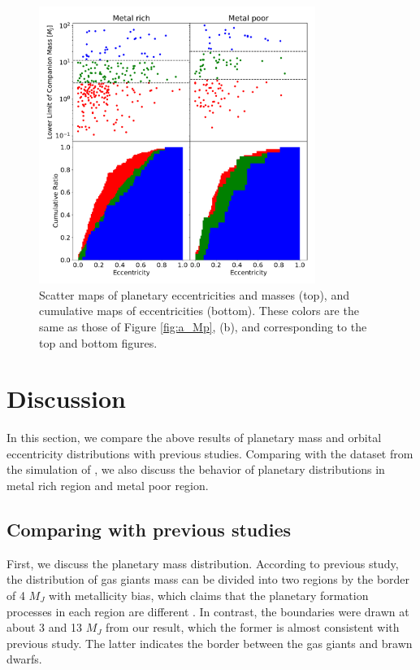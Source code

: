 \documentclass[twocolumn, dvipdfmx]{aastex62}
\begin{document}
\begin{CJK*}{UTF8}{min}
\begin{figure}[H]
\begin{center}
\includegraphics[width=9cm]{../../../Figure/e_Mp_merge.pdf}
\caption{Scatter maps of planetary eccentricities and masses (top), and cumulative maps of eccentricities (bottom). These colors are the same as those of Figure \ref{fig:a_Mp}, (b), and corresponding to the top and bottom figures. \label{fig:e_Mp}}
\end{center}
\end{figure}


\section{Discussion}

In this section, we compare the above results of planetary mass and orbital eccentricity distributions with previous studies. Comparing with the dataset from the simulation of \cite{2012A&A...541A..97M}, we also discuss the behavior of planetary distributions in metal rich region and metal poor region.


\subsection{Comparing with previous studies}

First, we discuss the planetary mass distribution. According to previous study, the distribution of gas giants mass can be divided into two regions by the border of 4 $M_J$ with metallicity bias, which claims that the planetary formation processes in each region are different \citep{2017A&A...603A..30S}. In contrast, the boundaries were drawn at about 3 and 13 $M_J$ from our result, which the former is almost consistent with previous study. The latter indicates the border between the gas giants and brawn dwarfs.


\end{CJK*}
\end{document}
